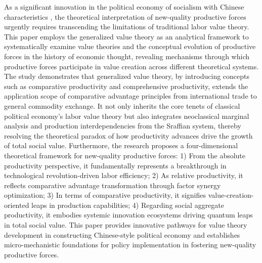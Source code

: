 \begin{abstract*}

As a significant innovation in the political economy of socialism with Chinese characteristics
, the theoretical interpretation of new-quality productive forces urgently requires transcending the limitations of traditional labor value theory. This paper employs the generalized value theory as an analytical framework to systematically examine value theories and the conceptual evolution of productive forces in the history of economic thought, revealing mechanisms through which productive forces participate in value creation across different theoretical systems. The study demonstrates that generalized value theory, by introducing concepts such as comparative productivity and comprehensive productivity, extends the application scope of comparative advantage principles from international trade to general commodity exchange. It not only inherits the core tenets of classical political economy's labor value theory but also integrates neoclassical marginal analysis and production interdependencies from the Sraffian system, thereby resolving the theoretical paradox of how productivity advances drive the growth of total social value. Furthermore, the research proposes a four-dimensional theoretical framework for new-quality productive forces: 1) From the absolute productivity perspective, it fundamentally represents a breakthrough in technological revolution-driven labor efficiency; 2) As relative productivity, it reflects comparative advantage transformation through factor synergy optimization; 3) In terms of comparative productivity, it signifies value-creation-oriented leaps in production capabilities; 4) Regarding social aggregate productivity, it embodies systemic innovation ecosystems driving quantum leaps in total social value. This paper provides innovative pathways for value theory development in constructing Chinese-style political economy and establishes micro-mechanistic foundations for policy implementation in fostering new-quality productive forces.


\end{abstract*}
